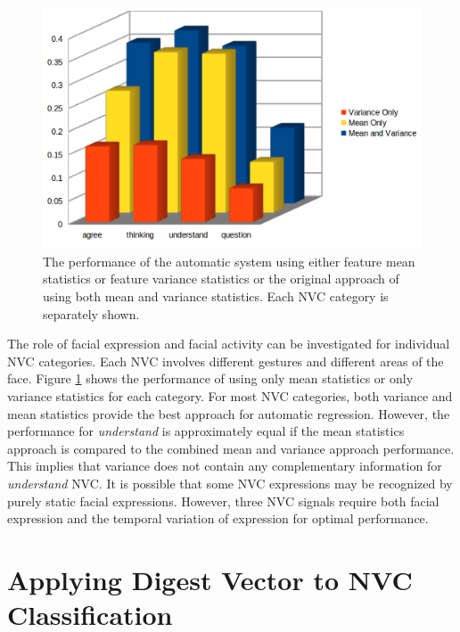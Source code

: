 \begin{figure}
\centering
\includegraphics[width = 0.85 \columnwidth]{nvcregression/MeanVarPlotWithCategories.png}
\caption[The performance of the automatic system using either feature mean statistics or feature variance statistics or the original approach of using both mean and variance statistics.]{The performance of the automatic system using either feature mean statistics or feature variance statistics or the original approach of using both mean and variance statistics. Each \ac{NVC} category is separately shown.}
\label{FigureMeanOrVarianceComparedWithCategories}
\end{figure}

The role of facial expression and facial activity can be investigated for individual \ac{NVC} categories. Each \ac{NVC} involves different gestures and different areas of the face. Figure \ref{FigureMeanOrVarianceComparedWithCategories} shows the performance of using only mean statistics or only variance statistics for each category. For most \ac{NVC} categories, both variance and mean statistics provide the best approach for automatic regression. However, the performance for \textit{understand} is approximately equal if the mean statistics approach is compared to the combined mean and variance approach performance. This implies that variance does not contain any complementary information for \textit{understand} \ac{NVC}. It is possible that some \ac{NVC} expressions may be recognized by purely static facial expressions. However, three \ac{NVC} signals require both facial expression and the temporal variation of expression for optimal performance.

\section{Applying Digest Vector to \ac{NVC} Classification}
\label{SectionDigestVectorOnClassification}

